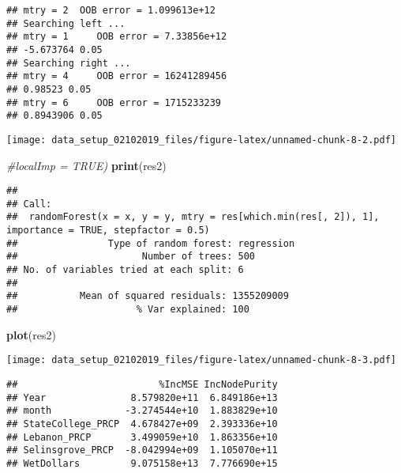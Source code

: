 \documentclass[]{article}
\newenvironment{Shaded}{\begin{snugshade}}{\end{snugshade}}
\newcommand{\KeywordTok}[1]{\textcolor[rgb]{0.13,0.29,0.53}{\textbf{{#1}}}}
\newcommand{\CommentTok}[1]{\textcolor[rgb]{0.56,0.35,0.01}{\textit{{#1}}}}
\newcommand{\NormalTok}[1]{{#1}}
\begin{document}
\begin{verbatim}
## mtry = 2  OOB error = 1.099613e+12 
## Searching left ...
## mtry = 1     OOB error = 7.33856e+12 
## -5.673764 0.05 
## Searching right ...
## mtry = 4     OOB error = 16241289456 
## 0.98523 0.05 
## mtry = 6     OOB error = 1715233239 
## 0.8943906 0.05
\end{verbatim}

\texttt{[image: data\_setup\_02102019\_files/figure-latex/unnamed-chunk-8-2.pdf]}

\begin{Shaded}
\begin{Highlighting}[]
              \CommentTok{#localImp = TRUE)}
\KeywordTok{print}\NormalTok{(res2)}
\end{Highlighting}
\end{Shaded}

\begin{verbatim}
## 
## Call:
##  randomForest(x = x, y = y, mtry = res[which.min(res[, 2]), 1],      importance = TRUE, stepfactor = 0.5) 
##                Type of random forest: regression
##                      Number of trees: 500
## No. of variables tried at each split: 6
## 
##           Mean of squared residuals: 1355209009
##                     % Var explained: 100
\end{verbatim}

\begin{Shaded}
\begin{Highlighting}[]
\KeywordTok{plot}\NormalTok{(res2)}
\end{Highlighting}
\end{Shaded}

\texttt{[image: data\_setup\_02102019\_files/figure-latex/unnamed-chunk-8-3.pdf]}

\begin{Shaded}
\end{Shaded}

\begin{verbatim}
##                         %IncMSE IncNodePurity
## Year               8.579820e+11  6.849186e+13
## month             -3.274544e+10  1.883829e+10
## StateCollege_PRCP  4.678427e+09  2.393336e+10
## Lebanon_PRCP       3.499059e+10  1.863356e+10
## Selinsgrove_PRCP  -8.042994e+09  1.105070e+11
## WetDollars         9.075158e+13  7.776690e+15
\end{verbatim}
\end{document}
